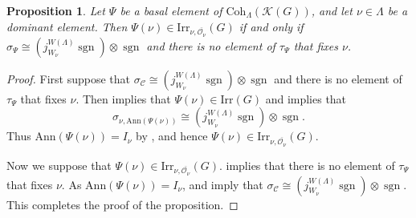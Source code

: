 \documentclass[12pt]{amsart}
\newcommand{\CC}{{\mathcal {C}}}
\newcommand{\CK}{{\mathcal {K}}}
\newcommand{\CO}{{\mathcal {O}}}
\DeclareMathOperator{\Ann}{Ann}
\def\CCL{\CC^L}
\def\CCLR{\CC^{LR}}
\newcommand{\sgn}{\operatorname{sgn}}
\numberwithin{equation}{section}
\newtheorem{prop}[thm]{Proposition}
\theoremstyle{remark}
\def\Irr{\mathrm{Irr}}
\def\Coh{\mathrm{Coh}}
\begin{document}
%
%

\begin{prop}\label{hcass222}
Let $\Psi$ be a basal element of $\Coh_\Lambda(\CK(G))$, and let  $\nu\in \Lambda$ be a dominant element. Then $\Psi(\nu)\in \Irr_{\nu, \overline{\CO_\nu}}(G)$ if and only if $\sigma_\Psi\cong \left( j_{W_\nu}^{W(\Lambda)} \sgn\right)\otimes \sgn $ and there is no element of   $ \tau_\Psi$  that fixes $\nu$.
\end{prop}

\begin{proof}
First suppose that $\sigma_\CC\cong \left( j_{W_\nu}^{W(\Lambda)} \sgn\right)\otimes \sgn$ and there is no element of   $ \tau_\Psi$  that fixes $\nu$.
Then  implies that $\Psi(\nu)\in \Irr(G)$ and   implies that
\[
\sigma_{\nu, \mathrm{Ann}(\Psi(\nu))}\cong  \left( j_{W_\nu}^{W(\Lambda)} \sgn\right)\otimes \sgn.
\]
Thus $ \mathrm{Ann}(\Psi(\nu))=I_\nu$ by , and hence $ \Psi(\nu)\in \Irr_{\nu, \overline{\CO_\nu}}(G)$.

Now we suppose that $\Psi(\nu)\in \Irr_{\nu, \overline{\CO_\nu}}(G)$.  implies that there is no element of   $ \tau_\Psi$  that fixes $\nu$.
As $ \mathrm{Ann}(\Psi(\nu))=I_\nu$,  and   imply that $\sigma_\CC\cong \left( j_{W_\nu}^{W(\Lambda)} \sgn\right)\otimes \sgn$. This completes the proof of the proposition.
\end{proof}
\end{document}
